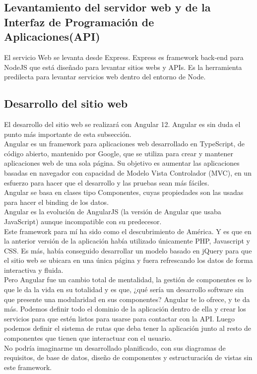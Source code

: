 \subsection{Levantamiento del servidor web y de la Interfaz de Programación de Aplicaciones(API)}

El servicio Web se levanta desde Express. Express es framework back-end para NodeJS que está diseñado para levantar sitios webs y APIs. Es la herramienta predilecta para levantar servicios web dentro del entorno de Node.

\subsection{Desarrollo del sitio web}

El desarrollo del sitio web se realizará con Angular 12. Angular es sin duda el punto más importante de esta subsección.
\\Angular es un framework para aplicaciones web desarrollado en TypeScript, de código abierto, mantenido por Google, que se utiliza para crear y mantener aplicaciones web de una sola página. Su objetivo es aumentar las aplicaciones basadas en navegador con capacidad de Modelo Vista Controlador (MVC), en un esfuerzo para hacer que el desarrollo y las pruebas sean más fáciles.
\\Angular se basa en clases tipo Componentes, cuyas propiedades son las usadas para hacer el binding de los datos.
\\Angular es la evolución de AngularJS (la versión de Angular que usaba JavaScript) aunque incompatible con su predecesor.
\\Este framework para mí ha sido como el descubrimiento de América. Y es que en la anterior versión de la aplicación había utilizado únicamente PHP, Javascript y CSS. Es más, había conseguido desarrollar un modelo basado en jQuery para que el sitio web se ubicara en una única página y fuera refrescando los datos de forma interactiva y fluida. 
\\Pero Angular fue un cambio total de mentalidad, la gestión de componentes es lo que le da la vida en su totalidad y es que, ¿qué sería un desarrollo software sin que presente una modularidad en sus componentes? Angular te lo ofrece, y te da más. Podemos definir todo el dominio de la aplicación dentro de ella y crear los servicios para que estén listos para usarse para contactar con la API. Luego podemos definir el sistema de rutas que deba tener la aplicación junto al resto de componentes que tienen que interactuar con el usuario.
\\No podría imaginarme un desarrollado planificado, con sus diagramas de requisitos, de base de datos, diseño de componentes y estructuración de vistas sin este framework.

